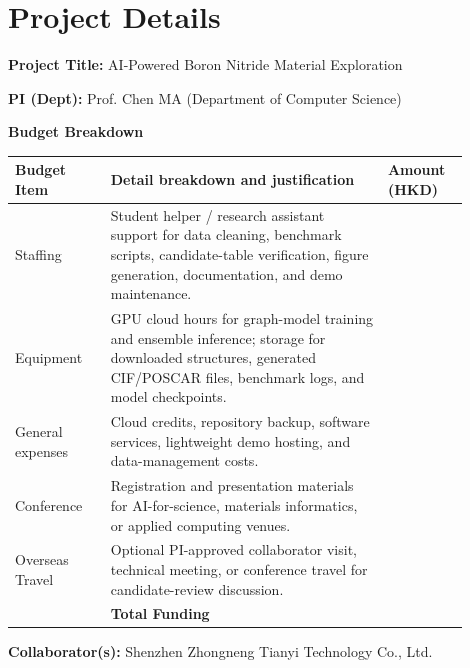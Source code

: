 \documentclass[10pt,a4paper]{article}
\newcommand{\blank}[1][7em]{\colorbox{yellow!35}{\rule{0pt}{1.05em}\hspace{#1}}}
\begin{document}
\section*{Project Details}
\textbf{Project Title:} AI-Powered Boron Nitride Material Exploration

\textbf{PI (Dept):} Prof. Chen MA (Department of Computer Science)

\textbf{Budget Breakdown}
\begin{center}
\small
\begin{tabular}{>{\raggedright\arraybackslash}p{0.19\linewidth}>{\raggedright\arraybackslash}p{0.55\linewidth}>{\raggedright\arraybackslash}p{0.16\linewidth}}
\toprule
\textbf{Budget Item} & \textbf{Detail breakdown and justification} & \textbf{Amount (HKD)}\\
\midrule
Staffing & Student helper / research assistant support for data cleaning, benchmark scripts, candidate-table verification, figure generation, documentation, and demo maintenance. & \blank\\
Equipment & GPU cloud hours for graph-model training and ensemble inference; storage for downloaded structures, generated CIF/POSCAR files, benchmark logs, and model checkpoints. & \blank\\
General expenses & Cloud credits, repository backup, software services, lightweight demo hosting, and data-management costs. & \blank\\
Conference & Registration and presentation materials for AI-for-science, materials informatics, or applied computing venues. & \blank\\
Overseas Travel & Optional PI-approved collaborator visit, technical meeting, or conference travel for candidate-review discussion. & \blank\\
\midrule
 & \textbf{Total Funding} & \blank\\
\bottomrule
\end{tabular}
\end{center}

\textbf{Collaborator(s):} Shenzhen Zhongneng Tianyi Technology Co., Ltd.
\end{document}
